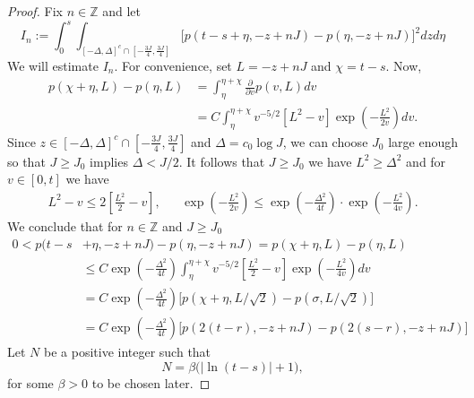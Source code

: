 \documentclass[12pt]{amsart}
\numberwithin{equation}{section}
\theoremstyle{definition}
\numberwithin{equation}{section}
\newcommand{\Z}{\mathbb{Z}}
\begin{document}
\begin{proof}
Fix $n \in \Z$ and let
\begin{equation} \label{eq:term_n}
I_n :=  \int_{0}^{s}
    \int_{[-\Delta,\Delta]^c\cap\left[-\frac{3J}{4},\frac{3J}{4}\right]}
    \Big[p(t-s +\eta,-z+nJ)-p(\eta,-z+nJ)\Big]^2dzd\eta
\end{equation}
We will estimate $I_n$. For convenience, 
set $L=-z+nJ$ and $\chi=t-s$. Now, 
\begin{align*}
p(\chi +\eta,L)-p(\eta,L)
&= \int_{\eta}^{\eta+\chi }\frac{\partial}{\partial v}p(v,L)dv  \\
&= C\int_{\eta}^{\eta+\chi }v^{-5/2}[L^2-v]
           \exp\left(-\frac{L^2}{2v}\right)dv.  
\end{align*}
Since $z\in [-\Delta,\Delta]^c\cap\left[-\frac{3J}{4},\frac{3J}{4}\right]$ 
and $\Delta=c_0\log J$, we can choose $J_0$ large enough so that 
$J\geq J_0$ implies $\Delta<J/2$.  It follows that $J \geq J_0$ we have  
$L^2\ge\Delta^2$ and for $v\in[0,t]$ we 
have
\begin{align*}
L^2-v \le 2\left[\frac{L^2}{2}-v\right],
&&  \exp\left(-\frac{L^2}{2v}\right) \le 
   \exp\left(-\frac{\Delta^2}{4t}\right)
   \cdot\exp\left(-\frac{L^2}{4v}\right).  
\end{align*}
We conclude that for $n \in \Z$ and $J \geq J_0$
\begin{equation} \label{eq:diff_p_s}
\begin{split}
0 < p(t-s &+\eta,-z+nJ)-p(\eta,-z+nJ)  = p(\chi +\eta,L)-p(\eta,L)\\ &\le 
   C\exp\left(-\frac{\Delta^2}{4t}\right)
     \int_{\eta}^{\eta+\chi }v^{-5/2}\left[\frac{L^2}{2}-v\right]
           \exp\left(-\frac{L^2}{4v}\right)dv   \\
&= C\exp\left(-\frac{\Delta^2}{4t}\right)
     \Big[p(\chi +\eta,L/\sqrt{2})-p(\sigma,L/\sqrt{2})\Big]  \\
&= C\exp\left(-\frac{\Delta^2}{4t}\right)
     \Big[p(2(t-r),-z+nJ)-p(2(s-r),-z+nJ)\Big]
\end{split}
\end{equation}
Let $N$ be a positive integer such that
\begin{equation} \label{eq:Nchoice}
N = \beta \big(|\ln(t-s)|+1\big),
\end{equation}
for some $\beta>0$ to be chosen later.


\end{proof}
\end{document}
